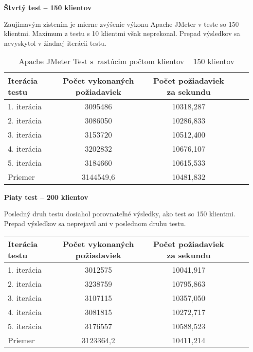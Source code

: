 \documentclass[12pt,oneside,final]{fithesis-utf8}
\begin{document}
\begin{itemize}
\textbf{Štvrtý test -- 150 klientov}

Zaujímavým zistením je mierne zvýšenie výkonu Apache JMeter v teste so 150 klientmi. Maximum z testu s 10 klientmi však neprekonal. Prepad výsledkov sa nevyskytol v žiadnej iterácii testu.

\begin{table}[H]
\begin{center}
\begin{tabular}{ | l | c | c | c | c |}
		\hline
		 \textbf{Iterácia testu} & \textbf{Počet vykonaných požiadaviek} & \textbf{Počet požiadaviek za sekundu} \\ \hline
		 1. iterácia & 3095486 & 10318,287 \\ \hline
		 2. iterácia & 3086050 & 10286,833 \\ \hline
		 3. iterácia & 3153720 & 10512,400 \\ \hline
		 4. iterácia & 3202832 & 10676,107 \\ \hline
		 5. iterácia & 3184660 & 10615,533 \\ \hline
		 Priemer & 3144549,6 & 10481,832 \\ \hline
		 
\end{tabular}
\end{center}
\caption{Apache JMeter Test s~rastúcim počtom klientov -- 150 klientov}
\end{table}


\textbf{Piaty test -- 200 klientov}

Posledný druh testu dosiahol porovnateľné výsledky, ako test so 150 klientmi. Prepad výsledkov sa neprejavil ani v poslednom druhu testu.

\begin{table}[H]
\begin{center}
\begin{tabular}{ | l | c | c | c | c |}
		\hline
		 \textbf{Iterácia testu} & \textbf{Počet vykonaných požiadaviek} & \textbf{Počet požiadaviek za sekundu} \\ \hline
		 1. iterácia & 3012575 & 10041,917 \\ \hline
		 2. iterácia & 3238759 & 10795,863 \\ \hline
		 3. iterácia & 3107115 & 10357,050 \\ \hline
		 4. iterácia & 3081815 & 10272,717 \\ \hline
		 5. iterácia & 3176557 & 10588,523 \\ \hline
		 Priemer & 3123364,2 & 10411,214 \\ \hline
		 

\end{tabular}
\end{center}
\end{table}
\end{itemize}
\end{document}
